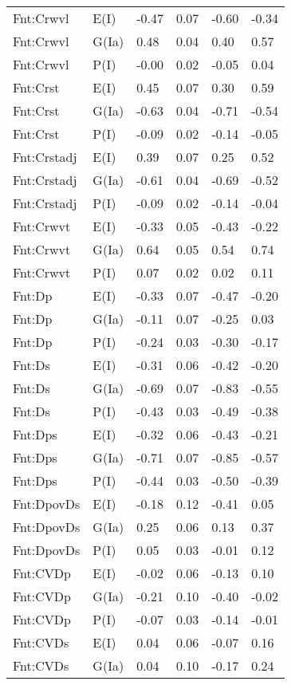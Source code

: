 \begin{center}
\begin{longtable}{|p{1.1in}|p{0.7in}|p{0.7in}|p{0.6in}|p{0.6in}|p{0.6in}|}
  Fnt:Crwvl & E(I) & -0.47 & 0.07 & -0.60 & -0.34 \\ 
  Fnt:Crwvl & G(Ia) & 0.48 & 0.04 & 0.40 & 0.57 \\ 
  Fnt:Crwvl & P(I) & -0.00 & 0.02 & -0.05 & 0.04 \\ 
  Fnt:Crst & E(I) & 0.45 & 0.07 & 0.30 & 0.59 \\ 
  Fnt:Crst & G(Ia) & -0.63 & 0.04 & -0.71 & -0.54 \\ 
  Fnt:Crst & P(I) & -0.09 & 0.02 & -0.14 & -0.05 \\ 
  Fnt:Crstadj & E(I) & 0.39 & 0.07 & 0.25 & 0.52 \\ 
  Fnt:Crstadj & G(Ia) & -0.61 & 0.04 & -0.69 & -0.52 \\ 
  Fnt:Crstadj & P(I) & -0.09 & 0.02 & -0.14 & -0.04 \\ 
  Fnt:Crwvt & E(I) & -0.33 & 0.05 & -0.43 & -0.22 \\ 
  Fnt:Crwvt & G(Ia) & 0.64 & 0.05 & 0.54 & 0.74 \\ 
  Fnt:Crwvt & P(I) & 0.07 & 0.02 & 0.02 & 0.11 \\ 
  Fnt:Dp & E(I) & -0.33 & 0.07 & -0.47 & -0.20 \\ 
  Fnt:Dp & G(Ia) & -0.11 & 0.07 & -0.25 & 0.03 \\ 
  Fnt:Dp & P(I) & -0.24 & 0.03 & -0.30 & -0.17 \\ 
  Fnt:Ds & E(I) & -0.31 & 0.06 & -0.42 & -0.20 \\ 
  Fnt:Ds & G(Ia) & -0.69 & 0.07 & -0.83 & -0.55 \\ 
  Fnt:Ds & P(I) & -0.43 & 0.03 & -0.49 & -0.38 \\ 
  Fnt:Dps & E(I) & -0.32 & 0.06 & -0.43 & -0.21 \\ 
  Fnt:Dps & G(Ia) & -0.71 & 0.07 & -0.85 & -0.57 \\ 
  Fnt:Dps & P(I) & -0.44 & 0.03 & -0.50 & -0.39 \\ 
  Fnt:DpovDs & E(I) & -0.18 & 0.12 & -0.41 & 0.05 \\ 
  Fnt:DpovDs & G(Ia) & 0.25 & 0.06 & 0.13 & 0.37 \\ 
  Fnt:DpovDs & P(I) & 0.05 & 0.03 & -0.01 & 0.12 \\ 
  Fnt:CVDp & E(I) & -0.02 & 0.06 & -0.13 & 0.10 \\ 
  Fnt:CVDp & G(Ia) & -0.21 & 0.10 & -0.40 & -0.02 \\ 
  Fnt:CVDp & P(I) & -0.07 & 0.03 & -0.14 & -0.01 \\ 
  Fnt:CVDs & E(I) & 0.04 & 0.06 & -0.07 & 0.16 \\ 
  Fnt:CVDs & G(Ia) & 0.04 & 0.10 & -0.17 & 0.24 \\ 

\end{longtable}
\end{center}
